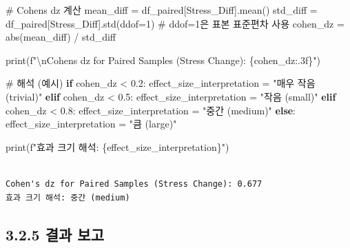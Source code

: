 \documentclass[
  letterpaper,
]{book}
\newenvironment{Shaded}{\begin{snugshade}}{\end{snugshade}}
\newcommand{\BuiltInTok}[1]{\textcolor[rgb]{0.00,0.23,0.31}{#1}}
\newcommand{\CharTok}[1]{\textcolor[rgb]{0.13,0.47,0.30}{#1}}
\newcommand{\CommentTok}[1]{\textcolor[rgb]{0.37,0.37,0.37}{#1}}
\newcommand{\ControlFlowTok}[1]{\textcolor[rgb]{0.00,0.23,0.31}{\textbf{#1}}}
\newcommand{\DecValTok}[1]{\textcolor[rgb]{0.68,0.00,0.00}{#1}}
\newcommand{\FloatTok}[1]{\textcolor[rgb]{0.68,0.00,0.00}{#1}}
\newcommand{\NormalTok}[1]{\textcolor[rgb]{0.00,0.23,0.31}{#1}}
\newcommand{\OperatorTok}[1]{\textcolor[rgb]{0.37,0.37,0.37}{#1}}
\newcommand{\SpecialCharTok}[1]{\textcolor[rgb]{0.37,0.37,0.37}{#1}}
\newcommand{\SpecialStringTok}[1]{\textcolor[rgb]{0.13,0.47,0.30}{#1}}
\newcommand{\StringTok}[1]{\textcolor[rgb]{0.13,0.47,0.30}{#1}}
\begin{document}
\begin{Shaded}
\begin{Highlighting}[]
\CommentTok{\# Cohen\textquotesingle{}s dz 계산}
\NormalTok{mean\_diff }\OperatorTok{=}\NormalTok{ df\_paired[}\StringTok{\textquotesingle{}Stress\_Diff\textquotesingle{}}\NormalTok{].mean()}
\NormalTok{std\_diff }\OperatorTok{=}\NormalTok{ df\_paired[}\StringTok{\textquotesingle{}Stress\_Diff\textquotesingle{}}\NormalTok{].std(ddof}\OperatorTok{=}\DecValTok{1}\NormalTok{) }\CommentTok{\# ddof=1은 표본 표준편차 사용}
\NormalTok{cohen\_dz }\OperatorTok{=} \BuiltInTok{abs}\NormalTok{(mean\_diff) }\OperatorTok{/}\NormalTok{ std\_diff}

\BuiltInTok{print}\NormalTok{(}\SpecialStringTok{f"}\CharTok{\textbackslash{}n}\SpecialStringTok{Cohen\textquotesingle{}s dz for Paired Samples (Stress Change): }\SpecialCharTok{\{}\NormalTok{cohen\_dz}\SpecialCharTok{:.3f\}}\SpecialStringTok{"}\NormalTok{)}

\CommentTok{\# 해석 (예시)}
\ControlFlowTok{if}\NormalTok{ cohen\_dz }\OperatorTok{\textless{}} \FloatTok{0.2}\NormalTok{:}
\NormalTok{    effect\_size\_interpretation }\OperatorTok{=} \StringTok{"매우 작음 (trivial)"}
\ControlFlowTok{elif}\NormalTok{ cohen\_dz }\OperatorTok{\textless{}} \FloatTok{0.5}\NormalTok{:}
\NormalTok{    effect\_size\_interpretation }\OperatorTok{=} \StringTok{"작음 (small)"}
\ControlFlowTok{elif}\NormalTok{ cohen\_dz }\OperatorTok{\textless{}} \FloatTok{0.8}\NormalTok{:}
\NormalTok{    effect\_size\_interpretation }\OperatorTok{=} \StringTok{"중간 (medium)"}
\ControlFlowTok{else}\NormalTok{:}
\NormalTok{    effect\_size\_interpretation }\OperatorTok{=} \StringTok{"큼 (large)"}

\BuiltInTok{print}\NormalTok{(}\SpecialStringTok{f"효과 크기 해석: }\SpecialCharTok{\{}\NormalTok{effect\_size\_interpretation}\SpecialCharTok{\}}\SpecialStringTok{"}\NormalTok{)}
\end{Highlighting}
\end{Shaded}

\begin{verbatim}

Cohen's dz for Paired Samples (Stress Change): 0.677
효과 크기 해석: 중간 (medium)
\end{verbatim}

\subsection{3.2.5 결과 보고}\label{uxacb0uxacfc-uxbcf4uxace0-1}
\end{document}
